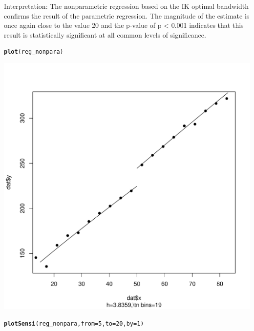 \documentclass[12pt]{article}\usepackage[]{graphicx}\usepackage[]{color}
\makeatletter
\def\maxwidth{ %
  \ifdim\Gin@nat@width>\linewidth
    \linewidth
  \else
    \Gin@nat@width
  \fi
}
\newcommand{\hlnum}[1]{\textcolor[rgb]{0.686,0.059,0.569}{#1}}%
\newcommand{\hlstd}[1]{\textcolor[rgb]{0.345,0.345,0.345}{#1}}%
\newcommand{\hlkwc}[1]{\textcolor[rgb]{0.333,0.667,0.333}{#1}}%
\newcommand{\hlkwd}[1]{\textcolor[rgb]{0.737,0.353,0.396}{\textbf{#1}}}%
\newenvironment{kframe}{%
 \def\at@end@of@kframe{}%
 \ifinner\ifhmode%
  \def\at@end@of@kframe{\end{minipage}}%
  \begin{minipage}{\columnwidth}%
 \fi\fi%
 \def\FrameCommand##1{\hskip\@totalleftmargin \hskip-\fboxsep
 \colorbox{shadecolor}{##1}\hskip-\fboxsep
     \hskip-\linewidth \hskip-\@totalleftmargin \hskip\columnwidth}%
 \MakeFramed {\advance\hsize-\width
   \@totalleftmargin\z@ \linewidth\hsize
   \@setminipage}}%
 {\par\unskip\endMakeFramed%
 \at@end@of@kframe}
\newenvironment{knitrout}{}{} %
\makeatother
\begin{document}
Interpretation: The nonparametric regression based on the IK optimal bandwidth confirms the result of the parametric regression. The magnitude of the estimate is once again close to the value 20 and the p-value of p < 0.001 indicates that this result is statistically significant at all common levels of significance.

\begin{knitrout}
\color{fgcolor}\begin{kframe}
\begin{alltt}
\hlkwd{plot}\hlstd{(reg_nonpara)}
\end{alltt}
\end{kframe}
\includegraphics[width=\maxwidth]{figure/unnamed-chunk-13-1} 
\begin{kframe}\begin{alltt}
\hlkwd{plotSensi}\hlstd{(reg_nonpara,} \hlkwc{from} \hlstd{=} \hlnum{5}\hlstd{,} \hlkwc{to} \hlstd{=} \hlnum{20}\hlstd{,} \hlkwc{by} \hlstd{=} \hlnum{1}\hlstd{)}
\end{alltt}
\end{kframe}

\end{knitrout}
\end{document}
